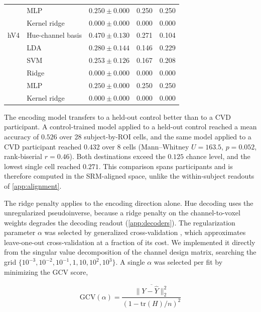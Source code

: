 \begin{table}[h]
\begin{tabular}{llccc}
   & MLP & $0.250 \pm 0.000$ & 0.250 & 0.250 \\
   & Kernel ridge & $0.000 \pm 0.000$ & 0.000 & 0.000 \\
\midrule
hV4 & Hue-channel basis & $\mathbf{0.470 \pm 0.130}$ & 0.271 & 0.104 \\
   & LDA & $0.280 \pm 0.144$ & 0.146 & 0.229 \\
   & SVM & $0.253 \pm 0.126$ & 0.167 & 0.208 \\
   & Ridge & $0.000 \pm 0.000$ & 0.000 & 0.000 \\
   & MLP & $0.250 \pm 0.000$ & 0.250 & 0.250 \\
   & Kernel ridge & $0.000 \pm 0.000$ & 0.000 & 0.000 \\
\bottomrule
\end{tabular}
\end{table}
The encoding model transfers to a held-out control better than to a CVD participant. A control-trained model applied to a held-out control reached a mean accuracy of $0.526$ over 28 subject-by-ROI cells, and the same model applied to a CVD participant reached $0.432$ over 8 cells (Mann--Whitney $U = 163.5$, $p = 0.052$, rank-biserial $r = 0.46$). Both destinations exceed the $0.125$ chance level, and the lowest single cell reached $0.271$. This comparison spans participants and is therefore computed in the SRM-aligned space, unlike the within-subject readouts of \cref{app:alignment}.




The ridge penalty applies to the encoding direction alone. Hue decoding uses the unregularized pseudoinverse, because a ridge penalty on the channel-to-voxel weights degrades the decoding readout (\cref{app:decoders}). The regularization parameter $\alpha$ was selected by generalized cross-validation \parencite{golub1979}, which approximates leave-one-out cross-validation at a fraction of its cost. We implemented it directly from the singular value decomposition of the channel design matrix, searching the grid $\{10^{-3}, 10^{-2}, 10^{-1}, 1, 10, 10^{2}, 10^{3}\}$. A single $\alpha$ was selected per fit by minimizing the GCV score,

\begin{equation}
\text{GCV}(\alpha) = \frac{\overline{\|Y - \hat{Y}\|_2^2}}{\left(1 - \text{tr}(H)/n\right)^2}
\end{equation}

